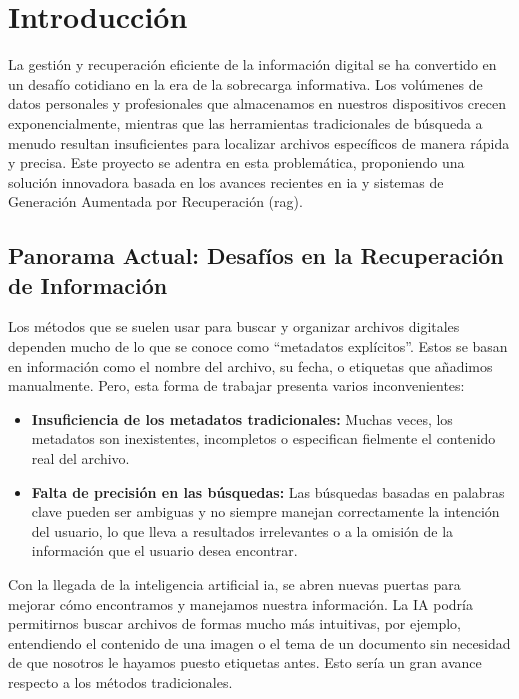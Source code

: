 
\chapter{Introducción}

La gestión y recuperación eficiente de la información digital se ha convertido en un desafío cotidiano en la era de la sobrecarga informativa. Los volúmenes de datos personales y profesionales que almacenamos en nuestros dispositivos crecen exponencialmente, mientras que las herramientas tradicionales de búsqueda a menudo resultan insuficientes para localizar archivos específicos de manera rápida y precisa. Este proyecto se adentra en esta problemática, proponiendo una solución innovadora basada en los avances recientes en \gls{ia} y sistemas de Generación Aumentada por Recuperación (\gls{rag}).

\section{Panorama Actual: Desafíos en la Recuperación de Información}
Los métodos que se suelen usar para buscar y organizar archivos digitales dependen mucho de lo que se conoce como ``metadatos explícitos''. Estos se basan en información como el nombre del archivo, su fecha, o etiquetas que añadimos manualmente. Pero, esta forma de trabajar presenta varios inconvenientes:
\begin{itemize}
\item  \textbf{Insuficiencia de los metadatos tradicionales:} Muchas veces, los metadatos son inexistentes, incompletos o especifican fielmente el contenido real del archivo.
\item  \textbf{Falta de precisión en las búsquedas:} Las búsquedas basadas en palabras clave pueden ser ambiguas y no siempre manejan correctamente la intención del usuario, lo que lleva a resultados irrelevantes o a la omisión de la información que el usuario desea encontrar.
\end{itemize}
Con la llegada de la inteligencia artificial \gls{ia}, se abren nuevas puertas para mejorar cómo encontramos y manejamos nuestra información. La IA podría permitirnos buscar archivos de formas mucho más intuitivas, por ejemplo, entendiendo el contenido de una imagen o el tema de un documento sin necesidad de que nosotros le hayamos puesto etiquetas antes. Esto sería un gran avance respecto a los métodos tradicionales.

